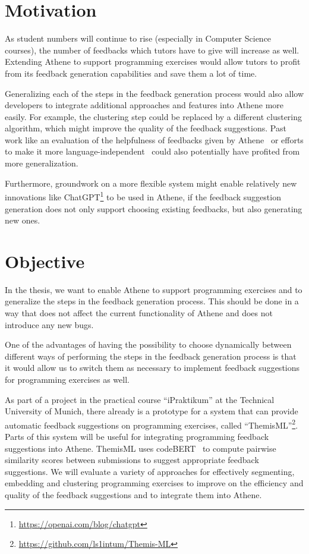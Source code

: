 \section*{Motivation}

As student numbers will continue to rise (especially in Computer Science courses), the number of feedbacks which tutors have to give will increase as well. Extending Athene to support programming exercises would allow tutors to profit from its feedback generation capabilities and save them a lot of time.

Generalizing each of the steps in the feedback generation process would also allow developers to integrate additional approaches and features into Athene more easily.
For example, the clustering step could be replaced by a different clustering algorithm, which might improve the quality of the feedback suggestions. Past work like an evaluation of the helpfulness of feedbacks given by Athene~\cite{atheneTracking} or efforts to make it more language-independent~\cite{atheneLanguage} could also potentially have profited from more generalization.

Furthermore, groundwork on a more flexible system might enable relatively new innovations like ChatGPT\footnote{\url{https://openai.com/blog/chatgpt}} to be used in Athene, if the feedback suggestion generation does not only support choosing existing feedbacks, but also generating new ones.

\section*{Objective}
In the thesis, we want to enable Athene to support programming exercises and to generalize the steps in the feedback generation process. This should be done in a way that does not affect the current functionality of Athene and does not introduce any new bugs.

One of the advantages of having the possibility to choose dynamically between different ways of performing the steps in the feedback generation process is that it would allow us to switch them as necessary to implement feedback suggestions for programming exercises as well. 

As part of a project in the practical course \enquote{iPraktikum} at the Technical University of Munich, there already is a prototype for a system that can provide automatic feedback suggestions on programming exercises, called \enquote{ThemisML}\footnote{\url{https://github.com/ls1intum/Themis-ML}}. 
Parts of this system will be useful for integrating programming feedback suggestions into Athene. ThemisML uses codeBERT~\cite{codeBERT} to compute pairwise similarity scores between submissions to suggest appropriate feedback suggestions. We will evaluate a variety of approaches for effectively segmenting, embedding and clustering programming exercises to improve on the efficiency and quality of the feedback suggestions and to integrate them into Athene.

